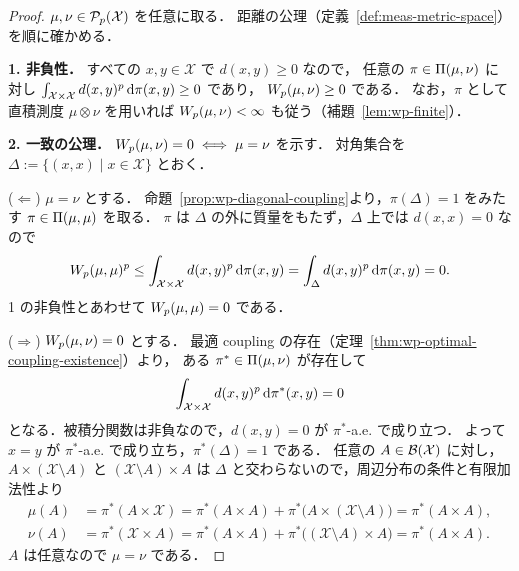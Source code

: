 \begin{proof}
  $\mu,\nu\in\mathcal{P}_{p}(\mathcal{X})$ を任意に取る．
  距離の公理（定義~\ref{def:meas-metric-space}）を順に確かめる．

  \textbf{1. 非負性．}
  すべての $x,y\in\mathcal{X}$ で $d(x,y)\geq0$ なので，
  任意の $\pi\in\Pi(\mu,\nu)$ に対し
  $\int_{\mathcal{X}\times\mathcal{X}}d(x,y)^p\,\mathrm{d}\pi(x,y)\geq0$ であり，
  $W_p(\mu,\nu)\geq0$ である．
  なお，$\pi$ として直積測度 $\mu\otimes\nu$ を用いれば
  $W_p(\mu,\nu)<\infty$ も従う（補題~\ref{lem:wp-finite}）．

  \textbf{2. 一致の公理．}
  $W_p(\mu,\nu)=0\iff\mu=\nu$ を示す．
  対角集合を $\Delta:=\{(x,x)\mid x\in\mathcal{X}\}$ とおく．

  ($\Leftarrow$) $\mu=\nu$ とする．
  命題~\ref{prop:wp-diagonal-coupling}より，$\pi(\Delta)=1$ をみたす
  $\pi\in\Pi(\mu,\mu)$ を取る．
  $\pi$ は $\Delta$ の外に質量をもたず，$\Delta$ 上では $d(x,x)=0$ なので
  \[
    W_p(\mu,\mu)^p
    \leq\int_{\mathcal{X}\times\mathcal{X}}d(x,y)^p\,\mathrm{d}\pi(x,y)
    =\int_{\Delta}d(x,y)^p\,\mathrm{d}\pi(x,y)=0.
  \]
  1 の非負性とあわせて $W_p(\mu,\mu)=0$ である．

  ($\Rightarrow$) $W_p(\mu,\nu)=0$ とする．
  最適 coupling の存在（定理~\ref{thm:wp-optimal-coupling-existence}）より，
  ある $\pi^*\in\Pi(\mu,\nu)$ が存在して
  \[
    \int_{\mathcal{X}\times\mathcal{X}}d(x,y)^p\,\mathrm{d}\pi^*(x,y)=0
  \]
  となる．被積分関数は非負なので，$d(x,y)=0$ が $\pi^*$-a.e. で成り立つ．
  よって $x=y$ が $\pi^*$-a.e. で成り立ち，$\pi^*(\Delta)=1$ である．
  任意の $A\in\mathcal{B}(\mathcal{X})$ に対し，
  $A\times(\mathcal{X}\setminus A)$ と $(\mathcal{X}\setminus A)\times A$ は
  $\Delta$ と交わらないので，周辺分布の条件と有限加法性より
  \[
    \begin{aligned}
      \mu(A)&=\pi^*(A\times\mathcal{X})
      =\pi^*(A\times A)+\pi^*\bigl(A\times(\mathcal{X}\setminus A)\bigr)
      =\pi^*(A\times A),\\
      \nu(A)&=\pi^*(\mathcal{X}\times A)
      =\pi^*(A\times A)+\pi^*\bigl((\mathcal{X}\setminus A)\times A\bigr)
      =\pi^*(A\times A).
    \end{aligned}
  \]
  $A$ は任意なので $\mu=\nu$ である．


\end{proof}
